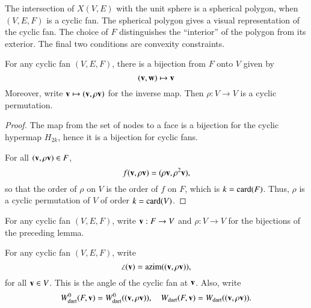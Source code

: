 The intersection of $X(V,E)$ with the unit sphere is a spherical polygon, when $(V,E,F)$ is a cyclic fan.  The spherical polygon gives a visual representation of the cyclic fan. The choice of $F$ distinguishes the ``interior'' of the polygon from its exterior.  The final two conditions are convexity constraints.  



\begin{lemma}  
For any cyclic fan $(V,E,F)$, there is a bijection from $F$ onto $V$ given by
$$
 ({\mathbf v},{\mathbf w}) \mapsto {\mathbf v}
$$
Moreover, write ${\mathbf v}\mapsto({\mathbf v},\rho{\mathbf v})$ for the inverse map. 
Then $\rho:V\to V$ is a cyclic permutation.
\end{lemma}
%

\begin{proof}  The map from the set of nodes to a face is a bijection for the cyclic hypermap $H_{2k}$, hence it is a bijection for cyclic fans.

For all $({\mathbf v},\rho {\mathbf v})\in F$,
$$f({\mathbf v},\rho {\mathbf v}) = (\rho{\mathbf v},\rho^2{\mathbf v}),$$
so that the order of $\rho$ on $V$ is the order of $f$ on $F$, which is $k={\operatorname{card}}(F)$.  Thus, $\rho$ is a cyclic permutation of $V$ of order $k={\operatorname{card}}(V)$.
\end{proof}

\begin{definition}[$\rho$,~$\v$]  For any cyclic fan $(V,E,F)$, 
write ${\mathbf v}:F\to V$ and $\rho:V\to V$ for the bijections of the preceding lemma.
\end{definition}
%
%

\begin{definition}
For any cyclic fan $(V,E,F)$,
 write
$$
\angle({\mathbf v}) = {\operatorname{azim}}(({\mathbf v},\rho{\mathbf v})),
$$
for all ${\mathbf v}\in V$.  This is the  angle of the cyclic fan at $\v$.
Also, write
$$
W^0_{\text{dart}}(F,{\mathbf v}) = W^0_{\text{dart}}(({\mathbf v},\rho {\mathbf v})),\quad W_{\text{dart}}(F,{\mathbf v}) =W_{\text{dart}}(({\mathbf v},\rho {\mathbf v})).
$$
%
%
%
\end{definition}






